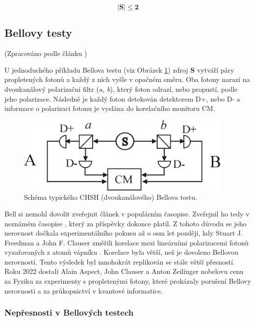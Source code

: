\begin{equation}
    \bm{|S| \leq 2}
    \label{eq:6}
\end{equation}

\clearpage

\subsection{Bellovy testy}
(Zpracováno podle článku \cite{belltest})

U jednoduchého příkladu Bellova testu (viz Obrázek \ref{fig:6}) zdroj \textbf{S} vytváří páry propletených fotonů a každý z nich vyšle v opačném směru. Oba fotony narazí na dvoukanálový polarizační filtr (\emph{a, b}), který foton odrazí, nebo propustí, podle jeho polarizace. Následně je každý foton detekován detektorem D+, nebo D- a informace o polarizaci fotonu je vyslána do korelačního monitoru CM.

\begin{figure}[ht]
    \centering
    \includegraphics[width=300pt]{images/Two_channel.png}
    \caption{\label{fig:6}Schéma typického CHSH (dvoukanálového) Bellova testu.}
\end{figure}

Bell si nemohl dovolit zveřejnit článek v populárním časopise. Zveřejnil ho tedy v neznámém časopise , který za příspěvky dokonce platil. Z tohoto důvodu se jeho nerovnost dočkala experimentálního pokusu až o osm let později, kdy Stuart J. Freedman a John F. Clauser změřili korelace mezi lineárními polarizacemi fotonů vyzařovaných z atomů vápníku \parencite*{belltest:1}. Korelace byla větší, než je dovoleno Bellovou nerovností. Tento výsledek byl mnohokrát replikován se stále větší přesností. Roku 2022 dostali Alain Aspect, John Clauser a Anton Zeilinger nobelovu cenu za Fyziku za experimenty s propletenými fotony, které prokázaly porušení Bellovy nerovnosti a za průkopnictví v kvantové informatice.

\subsubsection{Nepřesnosti v Bellových testech}

